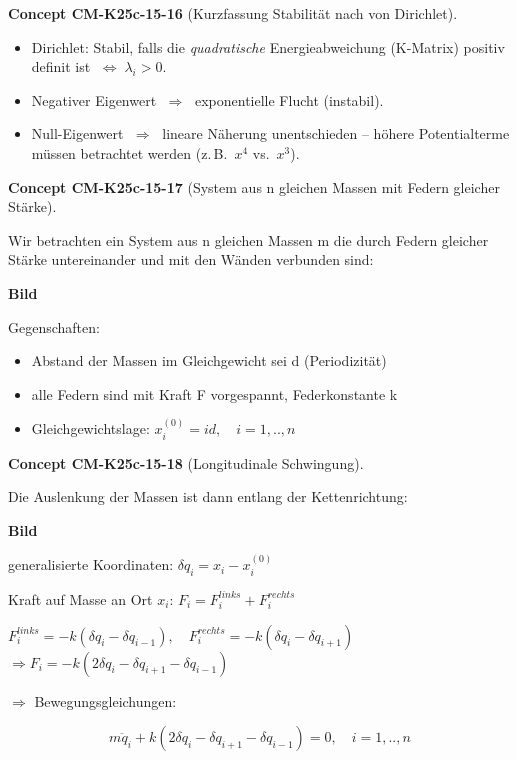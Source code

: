 \documentclass[10pt, letterpaper]{article}
\newcommand{\CustomHeading}[3]{%
  \par\medskip\noindent%
  \textbf{#1 #2} \textnormal{(#3)}.\enskip%
}
\newenvironment{CONC}[2]{\CustomHeading{Concept}{#1}{#2}}{}
\begin{document}
\begin{CONC}{CM-K25c-15-16}{Kurzfassung Stabilität nach von Dirichlet}
\begin{itemize}[leftmargin=*]
\item Dirichlet: Stabil, falls die \emph{quadratische} Energieabweichung
      (K-Matrix) positiv definit ist $\;\Longleftrightarrow\;\lambda_i>0$.
\item Negativer Eigenwert $\;\Longrightarrow\;$ exponentielle Flucht
      (instabil).  
\item Null-Eigenwert $\;\Longrightarrow\;$ lineare Näherung unentschieden –
      höhere Potentialterme müssen betrachtet werden (z.\,B.\ $x^4$ vs.\ $x^3$).
\end{itemize}
\end{CONC}

\begin{CONC}{CM-K25c-15-17}{System aus n gleichen Massen mit Federn gleicher Stärke}
Wir betrachten ein System aus n gleichen Massen m die durch Federn gleicher Stärke untereinander und mit den Wänden verbunden sind:

\textbf{Bild}

Gegenschaften:
\begin{itemize}
\item Abstand der Massen im Gleichgewicht sei d (Periodizität)
\item alle Federn sind mit Kraft F vorgespannt, Federkonstante k
\item Gleichgewichtslage: $x_i^{(0)} = id, \quad i=1,..,n$
\end{itemize}
\end{CONC}

\begin{CONC}{CM-K25c-15-18}{Longitudinale Schwingung}
Die Auslenkung der Massen ist dann entlang der Kettenrichtung:

\textbf{Bild}

generalisierte Koordinaten: $\delta q_i = x_i - x_i^{(0)}$

Kraft auf Masse an Ort $x_i$: $F_i = F_i^{links} + F_i^{rechts}$

$F_i^{links} = -k(\delta q_i - \delta q_{i-1}), \quad F_i^{rechts} = -k(\delta q_i - \delta q_{i+1})$
$\Rightarrow F_i = -k(2\delta q_i - \delta q_{i+1} - \delta q_{i-1})$

$\Rightarrow$ Bewegungsgleichungen:

\begin{equation}
m\ddot{q}_i + k(2\delta q_i - \delta q_{i+1} - \delta q_{i-1}) = 0, \quad i=1,..,n
\end{equation}
\end{CONC}
\end{document}
